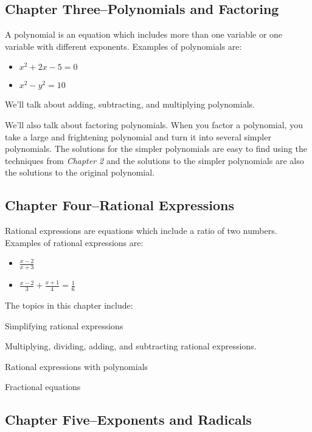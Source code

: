 \documentclass{article}
\begin{document}
\subsection{Chapter Three--Polynomials and Factoring}

A polynomial is an equation which includes more than one variable or one variable with different exponents.  Examples of
polynomials are:
\begin{itemize}
  \item \(x^2 + 2x -5 = 0\)
  \item \(x^2 - y^2 = 10 \)
\end{itemize}

We'll talk about adding, subtracting, and multiplying polynomials.

We'll also talk about factoring polynomials.  When you factor a polynomial, you take a large and frightening
polynomial and turn it into several simpler polynomials.  The solutions for the simpler polynomials are easy to find
using the techniques from {\em Chapter 2} and the solutions to the simpler polynomials are also the solutions to the
original polynomial.

\subsection{Chapter Four--Rational Expressions}

Rational expressions are equations which include a ratio of two numbers.  Examples of rational expressions are:

\begin{itemize}
  \item \( \frac{x - 2}{x + 3} \)
  \item \( \frac{x - 2}{3} + \frac{x + 1}{4} = \frac{1}{6} \)
\end{itemize}

The topics in this chapter include:

\begin{itemize*}
  \item Simplifying rational expressions
  \item Multiplying, dividing, adding, and subtracting rational expressions.
  \item Rational expressions with polynomials
  \item Fractional equations
\end{itemize*}

\subsection{Chapter Five--Exponents and Radicals}
\end{document}
